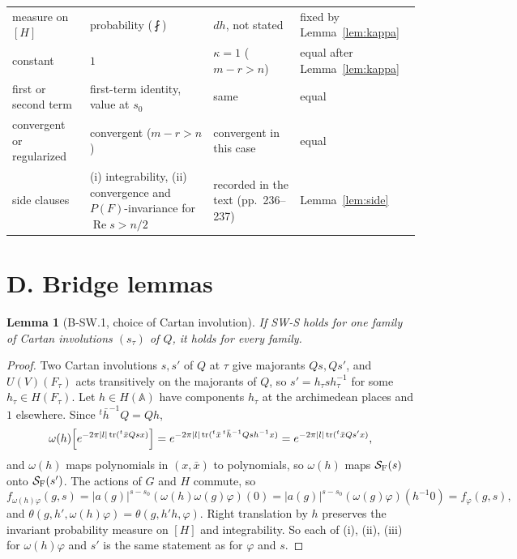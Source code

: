 \documentclass[11pt]{article}
\newtheorem{lemma}{Lemma}
\theoremstyle{definition}
\begin{document}
\begin{center}
\begin{longtable}{L{2.9cm}L{4.1cm}L{4.1cm}L{3.3cm}}
measure on $[H]$ & probability ($\fint$) & $dh$, not stated & fixed by Lemma~\ref{lem:kappa}\\
constant & $1$ & $\kappa=1$ ($m-r>n$) & equal after Lemma~\ref{lem:kappa}\\
first or second term & first-term identity, value at $s_0$ & same & equal\\
convergent or regularized & convergent ($m-r>n$) & convergent in this case & equal\\
side clauses & (i) integrability, (ii) convergence and $P(F)$-invariance for $\operatorname{Re}s>n/2$ & recorded in the text (pp.~236--237) & Lemma~\ref{lem:side}\\
\bottomrule
\end{longtable}
\end{center}

\section{D. Bridge lemmas}\label{sec:bridge}

\begin{lemma}[B-SW.1, choice of Cartan involution]\label{lem:cartan}
If SW-S holds for one family of Cartan involutions $(s_\tau)$ of $Q$, it holds for every family.
\end{lemma}

\begin{proof}
Two Cartan involutions $s,s'$ of $Q$ at $\tau$ give majorants $Qs,Qs'$, and $U(V)(F_\tau)$ acts transitively on the majorants of $Q$, so $s'=h_\tau sh_\tau^{-1}$ for some $h_\tau\in H(F_\tau)$. Let $h\in H(\mathbb A)$ have components $h_\tau$ at the archimedean places and $1$ elsewhere. Since ${}^t\bar h^{-1}Q=Qh$,
\[
\omega(h)\Bigl[e^{-2\pi|l|\operatorname{tr}({}^t\bar xQsx)}\Bigr]=e^{-2\pi|l|\operatorname{tr}({}^t\bar x\,{}^t\bar h^{-1}Qsh^{-1}x)}=e^{-2\pi|l|\operatorname{tr}({}^t\bar xQs'x)},
\]
and $\omega(h)$ maps polynomials in $(x,\bar x)$ to polynomials, so $\omega(h)$ maps $\mathcal S_{\rm F}(s)$ onto $\mathcal S_{\rm F}(s')$. The actions of $G$ and $H$ commute, so
\[
f_{\omega(h)\varphi}(g,s)=|a(g)|^{s-s_0}(\omega(h)\omega(g)\varphi)(0)=|a(g)|^{s-s_0}(\omega(g)\varphi)(h^{-1}0)=f_\varphi(g,s),
\]
and $\theta(g,h',\omega(h)\varphi)=\theta(g,h'h,\varphi)$. Right translation by $h$ preserves the invariant probability measure on $[H]$ and integrability. So each of (i), (ii), (iii) for $\omega(h)\varphi$ and $s'$ is the same statement as for $\varphi$ and $s$.
\end{proof}
\end{document}
